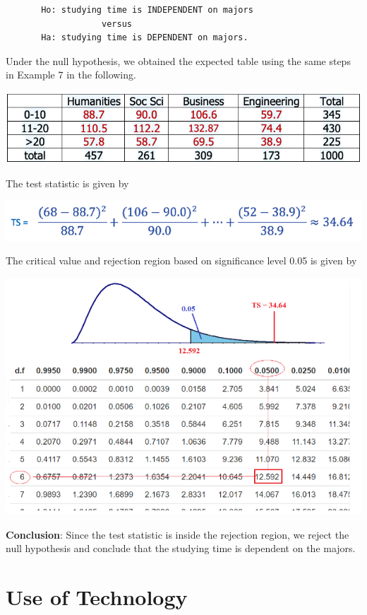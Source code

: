 \documentclass[
]{book}
\begin{document}
\begin{verbatim}
       Ho: studying time is INDEPENDENT on majors
                   versus
       Ha: studying time is DEPENDENT on majors.
\end{verbatim}

Under the null hypothesis, we obtained the expected table using the same steps in Example 7 in the following.

\begin{center}\includegraphics[width=0.55\linewidth]{week13/example09ExpTable} \end{center}

The test statistic is given by

\begin{center}\includegraphics[width=0.6\linewidth]{week13/example09TS} \end{center}

The critical value and rejection region based on significance level 0.05 is given by

\begin{center}\includegraphics[width=0.8\linewidth]{week13/example09CV} \end{center}

\textbf{Conclusion}: Since the test statistic is inside the rejection region, we reject the null hypothesis and conclude that the studying time is dependent on the majors.

\hypertarget{use-of-technology-11}{%
\section{Use of Technology}\label{use-of-technology-11}}
\end{document}
